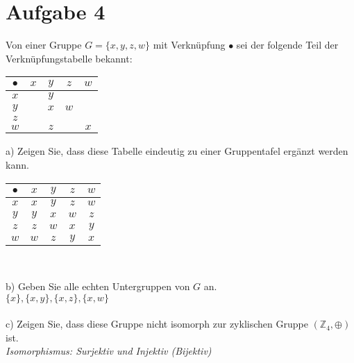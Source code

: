 \section*{Aufgabe 4}

Von einer Gruppe $G = \{x, y, z, w\}$ mit Verknüpfung $\bullet$ sei der folgende Teil der Verknüpfungstabelle
bekannt:

\begin{table}[h]
\begin{tabular}{c|cccc}
$\bullet$ & $x$ & $y$ & $z$ & $w$\\
\hline
$x$ & & $y$ & &\\
$y$ & & $x$ & $w$ &\\
$z$ & & & &\\
$w$ & & $z$ & & $x$
\end{tabular}
\end{table}

a) Zeigen Sie, dass diese Tabelle eindeutig zu einer Gruppentafel ergänzt werden kann.

\begin{table}[h]
\centering
\begin{tabular}{c|cccc}
$\bullet$ & $x$ & $y$ & $z$ & $w$\\
\hline
$x$ & $x$ & $y$ & $z$ & $w$\\
$y$ & $y$ & $x$ & $w$ & $z$\\
$z$ & $z$ & $w$ & $x$ & $y$\\
$w$ & $w$ & $z$ & $y$ & $x$
\end{tabular}
\end{table}\

b) Geben Sie alle echten Untergruppen von $G$ an.\\

$\{x\}, \{x, y\}, \{x, z\}, \{x, w\}$\\~\\

c) Zeigen Sie, dass diese Gruppe nicht isomorph zur zyklischen Gruppe $(\mathbb{Z}_4 , \oplus)$ ist.\\

\textit{Isomorphismus: Surjektiv und Injektiv (Bijektiv)}\\

\newpage
